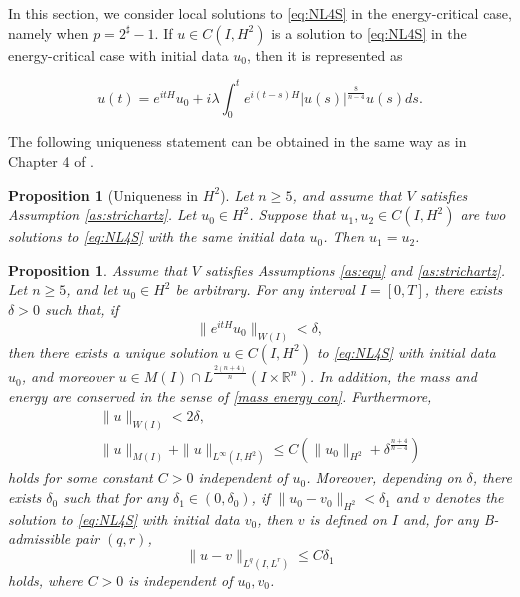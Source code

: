 \documentclass[11pt,a4paper]{article}
\numberwithin{equation}{section}
\newtheorem{proposition}[theorem]{Proposition}
\begin{document}
In this section, we consider local solutions to \eqref{eq:NL4S} in the energy-critical case, namely when $p = 2^{\sharp} - 1$.
If $u\in C(I, H^{2})$ is a solution to \eqref{eq:NL4S} in the energy-critical case with initial data $u_{0}$, then it is represented as

\begin{equation}\label{duhamel2}
u(t) = e^{itH}u_{0} + i\lambda \int_{0}^{t} e^{i(t - s)H}|u(s)|^{\frac{8}{n - 4}}u(s) ds.
\end{equation}

The following uniqueness statement can be obtained in the same way as in Chapter 4 of \cite{Caz}.

\begin{proposition}[Uniqueness in $H^{2}$]
Let $n \geq 5$, and assume that $V$ satisfies Assumption \ref{as:strichartz}. Let $u_{0} \in H^{2}$. Suppose that $u_{1}, u_{2} \in C(I, H^{2})$ are two solutions to \eqref{eq:NL4S} with the same initial data $u_{0}$. Then $u_{1} = u_{2}$.
\end{proposition}

\begin{proposition}\label{local existence}
Assume that $V$ satisfies Assumptions \ref{as:equ} and \ref{as:strichartz}. Let $n \geq 5$, and let $u_{0} \in H^{2}$ be arbitrary. For any interval $I = [0, T]$, there exists $\delta > 0$ such that, if
\begin{equation}\label{small}
\|e^{itH}u_{0}\|_{W(I)} < \delta,
\end{equation}
then there exists a unique solution $u\in C(I, H^{2})$ to \eqref{eq:NL4S} with initial data $u_{0}$, and moreover
$u\in M(I) \cap L^{\frac{2(n + 4)}{n}}(I \times \mathbb{R}^{n})$.
In addition, the mass and energy are conserved in the sense of \eqref{mass energy con}. Furthermore,
\begin{equation}\label{st}
\begin{array}{l}
\|u\|_{W(I)} < 2 \delta, \\
\|u\|_{M(I)} + \|u\|_{L^{\infty}(I, H^{2})} \leq C\left(\|u_{0}\|_{H^{2}} + \delta^{\frac{n + 4}{n - 4}}\right)
\end{array}
\end{equation}
holds for some constant $C > 0$ independent of $u_{0}$.
Moreover, depending on $\delta$, there exists $\delta_{0}$ such that for any $\delta_{1} \in (0, \delta_{0})$, if $\|u_{0} - v_{0}\|_{H^{2}} < \delta_{1}$ and $v$ denotes the solution to \eqref{eq:NL4S} with initial data $v_{0}$, then $v$ is defined on $I$ and, for any B-admissible pair $(q, r)$,
\begin{equation}\label{initconti}
\|u - v\|_{L^{q}(I, L^{r})} \leq C\delta_{1}
\end{equation}
holds, where $C > 0$ is independent of $u_{0}, v_{0}$.
\end{proposition}
\end{document}
